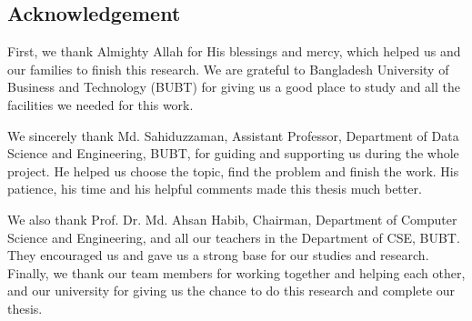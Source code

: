 \begin{center}
    \section*{Acknowledgement}
\end{center}
\large First, we thank Almighty Allah for His blessings and mercy, which helped us and our families to finish this research. We are grateful to Bangladesh University of Business and Technology (BUBT) for giving us a good place to study and all the facilities we needed for this work.

We sincerely thank Md. Sahiduzzaman, Assistant Professor, Department of Data Science and Engineering, BUBT, for guiding and supporting us during the whole project. He helped us choose the topic, find the problem and finish the work. His patience, his time and his helpful comments made this thesis much better.

We also thank Prof. Dr. Md. Ahsan Habib, Chairman, Department of Computer Science and Engineering, and all our teachers in the Department of CSE, BUBT. They encouraged us and gave us a strong base for our studies and research. Finally, we thank our team members for working together and helping each other, and our university for giving us the chance to do this research and complete our thesis.
